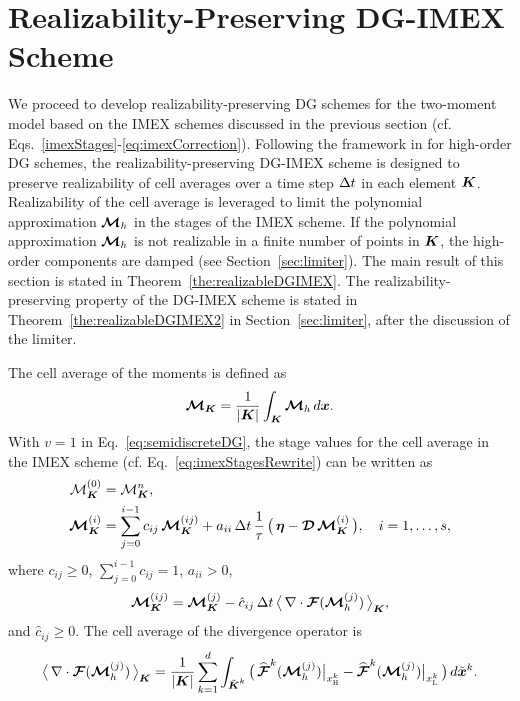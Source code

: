 \section{Realizability-Preserving DG-IMEX Scheme}
\label{sec:realizableDGIMEX}

We proceed to develop realizability-preserving DG schemes for the two-moment model based on the IMEX schemes discussed in the previous section (cf. Eqs.~\eqref{imexStages}-\eqref{eq:imexCorrection}).  
Following the framework in \cite{zhangShu_2010b} for high-order DG schemes, the realizability-preserving DG-IMEX scheme is designed to preserve realizability of cell averages over a time step $\Delta t$ in each element $\boldsymbol{K}$.  
Realizability of the cell average is leveraged to limit the polynomial approximation $\boldsymbol{\mathcal{M}}_{h}$ in the stages of the IMEX scheme.  
If the polynomial approximation $\boldsymbol{\mathcal{M}}_{h}$ is not realizable in a finite number of points in $\boldsymbol{K}$, the high-order components are damped (see Section~\ref{sec:limiter}).  
The main result of this section is stated in Theorem~\ref{the:realizableDGIMEX}.  
The realizability-preserving property of the DG-IMEX scheme is stated in Theorem~\ref{the:realizableDGIMEX2} in Section~\ref{sec:limiter}, after the discussion of the limiter.  

The cell average of the moments is defined as
\begin{equation}
  \boldsymbol{\mathcal{M}}_{\boldsymbol{K}}
  =\frac{1}{|\boldsymbol{K}|}\int_{\boldsymbol{K}}\boldsymbol{\mathcal{M}}_{h}\,d\boldsymbol{x}.  
\end{equation}
With $v=1$ in Eq.~\eqref{eq:semidiscreteDG}, the stage values for the cell average in the IMEX scheme (cf. Eq.~\eqref{eq:imexStagesRewrite}) can be written as
\begin{align}
  \mathcal{M}_{\boldsymbol{K}}^{(0)}
  &=\mathcal{M}_{\boldsymbol{K}}^{n}, \nonumber \\
  \boldsymbol{\mathcal{M}}_{\boldsymbol{K}}^{(i)}
  &=\sum_{j=0}^{i-1}c_{ij}\,\boldsymbol{\mathcal{M}}_{\boldsymbol{K}}^{(ij)}
  +a_{ii}\,\Delta t\,\frac{1}{\tau}\,\big(\,\boldsymbol{\eta}-\boldsymbol{\mathcal{D}}\,\boldsymbol{\mathcal{M}}_{\boldsymbol{K}}^{(i)}\,\big), \quad i=1,\ldots,s,
  \label{eq:imexStagesCellAverage}
\end{align}
where $c_{ij}\ge0$, $\sum_{j=0}^{i-1}c_{ij}=1$, $a_{ii}>0$, 
\begin{equation}
  \boldsymbol{\mathcal{M}}_{\boldsymbol{K}}^{(ij)}
  =\boldsymbol{\mathcal{M}}_{\boldsymbol{K}}^{(j)}-\hat{c}_{ij}\,\Delta t\,\big\langle\,\nabla\cdot\boldsymbol{\mathcal{F}}(\boldsymbol{\mathcal{M}}_{h}^{(j)})\,\big\rangle_{\boldsymbol{K}},
\end{equation}
and $\hat{c}_{ij}\ge0$.  
The cell average of the divergence operator is
\begin{equation}
  \big\langle\,\nabla\cdot\boldsymbol{\mathcal{F}}(\boldsymbol{\mathcal{M}}_{h}^{(j)})\,\big\rangle_{\boldsymbol{K}}
  =\frac{1}{|\boldsymbol{K}|}\sum_{k=1}^{d}\int_{\tilde{\boldsymbol{K}}^{k}}
  \big(\,\widehat{\boldsymbol{\mathcal{F}}}^{k}(\boldsymbol{\mathcal{M}}_{h}^{(j)})\big|_{x_{\textnormal{\tiny\textsc{H}}}^{k}}-\widehat{\boldsymbol{\mathcal{F}}}^{k}(\boldsymbol{\mathcal{M}}_{h}^{(j)})\big|_{x_{\textnormal{\tiny\textsc{L}}}^{k}}\,\big)\,d\tilde{\boldsymbol{x}}^{k}.  
\end{equation}

